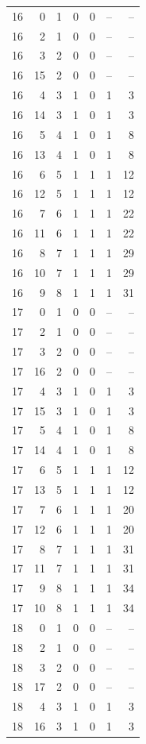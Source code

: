 \begin{longtable}{rrrrrrr}
16 & 0 & 1 & 0 & 0 & -- & --\\
16 & 2 & 1 & 0 & 0 & -- & --\\
16 & 3 & 2 & 0 & 0 & -- & --\\
16 & 15 & 2 & 0 & 0 & -- & --\\
16 & 4 & 3 & 1 & 0 & 1 & 3\\
16 & 14 & 3 & 1 & 0 & 1 & 3\\
16 & 5 & 4 & 1 & 0 & 1 & 8\\
16 & 13 & 4 & 1 & 0 & 1 & 8\\
16 & 6 & 5 & 1 & 1 & 1 & 12\\
16 & 12 & 5 & 1 & 1 & 1 & 12\\
16 & 7 & 6 & 1 & 1 & 1 & 22\\
16 & 11 & 6 & 1 & 1 & 1 & 22\\
16 & 8 & 7 & 1 & 1 & 1 & 29\\
16 & 10 & 7 & 1 & 1 & 1 & 29\\
16 & 9 & 8 & 1 & 1 & 1 & 31\\
17 & 0 & 1 & 0 & 0 & -- & --\\
17 & 2 & 1 & 0 & 0 & -- & --\\
17 & 3 & 2 & 0 & 0 & -- & --\\
17 & 16 & 2 & 0 & 0 & -- & --\\
17 & 4 & 3 & 1 & 0 & 1 & 3\\
17 & 15 & 3 & 1 & 0 & 1 & 3\\
17 & 5 & 4 & 1 & 0 & 1 & 8\\
17 & 14 & 4 & 1 & 0 & 1 & 8\\
17 & 6 & 5 & 1 & 1 & 1 & 12\\
17 & 13 & 5 & 1 & 1 & 1 & 12\\
17 & 7 & 6 & 1 & 1 & 1 & 20\\
17 & 12 & 6 & 1 & 1 & 1 & 20\\
17 & 8 & 7 & 1 & 1 & 1 & 31\\
17 & 11 & 7 & 1 & 1 & 1 & 31\\
17 & 9 & 8 & 1 & 1 & 1 & 34\\
17 & 10 & 8 & 1 & 1 & 1 & 34\\
18 & 0 & 1 & 0 & 0 & -- & --\\
18 & 2 & 1 & 0 & 0 & -- & --\\
18 & 3 & 2 & 0 & 0 & -- & --\\
18 & 17 & 2 & 0 & 0 & -- & --\\
18 & 4 & 3 & 1 & 0 & 1 & 3\\
18 & 16 & 3 & 1 & 0 & 1 & 3\\

\end{longtable}

